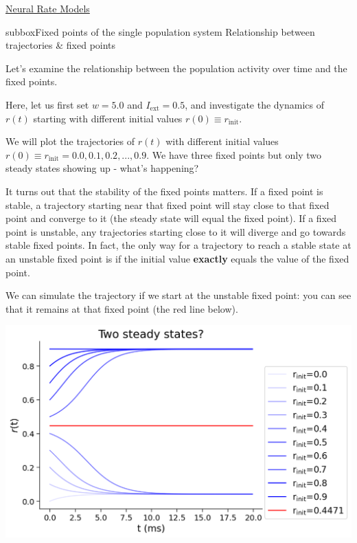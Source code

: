\begin{textbox}{\href{https://compneuro.neuromatch.io/tutorials/W2D4_DynamicNetworks/chapter_title.html}{Neural Rate Models } }
\begin{subbox}{subbox}{Fixed points of the single population system}
\scriptsize
Relationship between trajectories & fixed points

Let's examine the relationship between the population activity over time and the fixed points.

Here, let us first set $w=5.0$ and $I_{\text{ext}}=0.5$, and investigate the dynamics of $r(t)$ starting with different initial values $r(0) \equiv r_{\text{init}}$. 


We will plot the trajectories of $r(t)$ with different initial values $r(0) \equiv r_{\text{init}}  = 0.0, 0.1, 0.2,..., 0.9$.
We have three fixed points but only two steady states showing up - what's happening? 

It turns out that the stability of the fixed points matters. If a fixed point is stable, a trajectory starting near that fixed point will stay close to that fixed point and converge to it (the steady state will equal the fixed point). If a fixed point is unstable, any trajectories starting close to it will diverge and go towards stable fixed points. In fact, the only way for a trajectory to reach a stable state at an unstable fixed point is if the initial value \textbf{exactly} equals the value of the fixed point.

We can simulate the trajectory if we start at the unstable fixed point: you can see that it remains at that fixed point (the red line below).

\begin{center}
\includegraphics[scale=0.3]{Figures/DN/DN_Figure4.png}
\end{center}
\end{subbox}

\end{textbox}
